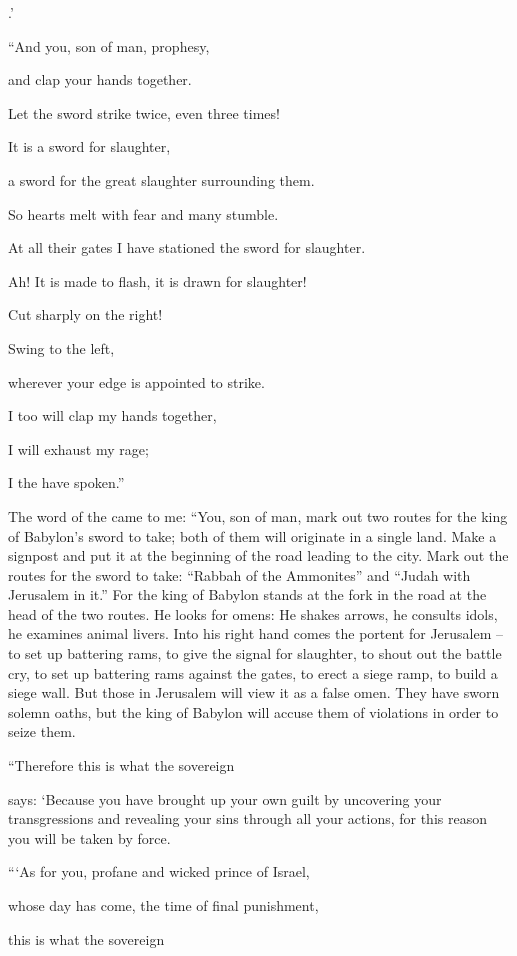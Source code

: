 {{}.’
\par }{\Q {}“And you,
son
of man,
prophesy,
\par }{\Q and clap your hands
together.
\par }{\Q Let
the sword
strike
twice,
even three times!
\par }{\Q It is
a sword
for slaughter,
\par }{\Q a sword
for the great
slaughter
surrounding them.
\par }{\Q {}So
hearts
melt
with fear and many
stumble.
\par }{\Q At
all
their gates
I have stationed
the sword
for slaughter.
\par }{\Q Ah! It is made
to flash,
it is drawn
for slaughter!
\par }{\Q {}Cut sharply
on the right!
\par }{\Q Swing
to the left,
\par }{\Q wherever your edge
is appointed to strike.
\par }{\Q {}I
too
will clap my hands
together,
\par }{\Q I will exhaust
my rage;
\par }{\Q I
the {}
have spoken.”
\par }{\PP {}The word
of the {}
came to me:
“You,
son
of man,
mark out
two
routes
for the king
of Babylon’s
sword
to take;
both
of them will originate
in a single
land.
Make
a signpost
and put it at the beginning
of the road
leading to the city.
Mark out
the routes
for the sword
to take: “Rabbah
of the Ammonites”
and “Judah
with Jerusalem
in it.”
For
the king
of Babylon
stands
at
the fork
in the road
at the head
of the two
routes.
He looks for
omens: He shakes
arrows,
he consults
idols,
he examines
animal livers.
Into his right hand
comes
the portent
for Jerusalem
– to set up
battering rams,
to give
the signal
for slaughter,
to shout out
the battle cry,
to set up
battering rams
against
the gates,
to erect a siege
ramp,
to build
a siege wall.
But
those
in Jerusalem
will view
it as a false omen.
They have sworn
solemn
oaths, but the king
of Babylon
will accuse
them of violations
in order to seize them.
\par }{\PP {}“Therefore
this is what
the sovereign

{}
says: ‘Because
you have brought up
your own guilt
by uncovering
your transgressions
and revealing
your sins
through all
your actions,
for this
reason
you will be taken
by force.
\par }{\Q {}“‘As for you,
profane
and wicked
prince
of Israel,
\par }{\Q whose
day
has come,
the time
of final
punishment,
\par }{\Q {}this is what
the sovereign

}
